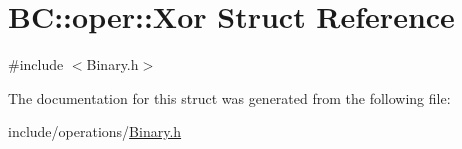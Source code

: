 \hypertarget{structBC_1_1oper_1_1Xor}{}\section{BC\+:\+:oper\+:\+:Xor Struct Reference}
\label{structBC_1_1oper_1_1Xor}


{\ttfamily \#include $<$Binary.\+h$>$}



The documentation for this struct was generated from the following file\+:\begin{DoxyCompactItemize}
\item 
include/operations/\hyperlink{Binary_8h}{Binary.\+h}\end{DoxyCompactItemize}
